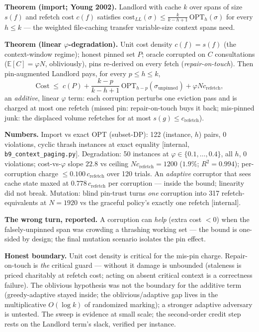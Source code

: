\documentclass[11pt,a4paper]{article}
\begin{document}
\begin{thebox}
\textbf{Theorem (import; Young 2002).} Landlord with cache $k$ over spans of size $s(f)$ and refetch cost $c(f)$ satisfies $\mathrm{cost}_{LL}(\sigma) \le \tfrac{k}{k-h+1}\,\mathrm{OPT}_h(\sigma)$ for every $h \le k$ --- the weighted file-caching transfer variable-size context spans need.

\textbf{Theorem (linear $\varphi$-degradation).} Unit cost density $c(f)=s(f)$ (the context-window regime); honest pinned set $P$; oracle corrupted on $C$ consultations ($\mathbb{E}[C]=\varphi N$, obliviously), pins re-derived on every fetch (\emph{repair-on-touch}). Then pin-augmented Landlord pays, for every $p \le h \le k$,
\[\mathrm{Cost} \;\le\; c(P) + \frac{k-p}{k-h+1}\,\mathrm{OPT}_{h-p}(\sigma_{\mathrm{unpinned}}) + \varphi N c_{\mathrm{refetch}},\]
an \emph{additive}, linear $\varphi$ term: each corruption perturbs one eviction pass and is charged at most one refetch (missed pin: repair-on-touch buys it back; mis-pinned junk: the displaced volume refetches for at most $s(g) \le c_{\mathrm{refetch}}$).
\end{thebox}

\textbf{Numbers.} Import vs exact OPT (subset-DP): 122 (instance, $h$) pairs, 0 violations, cyclic thrash instances at exact equality [internal, \texttt{b9\_context\_paging.py}]. Degradation: 50 instances at $\varphi\in\{0.1,\dots,0.4\}$, all $h$, 0 violations; cost-vs-$\varphi$ slope $22.8$ vs ceiling $N c_{\mathrm{refetch}}=1200$ ($1.9\%$; $R^2=0.994$); per-corruption charge $\le 0.100\,c_{\mathrm{refetch}}$ over 120 trials. An \emph{adaptive} corruptor that sees cache state maxed at $0.778\,c_{\mathrm{refetch}}$ per corruption --- inside the bound; linearity did not break. Mutation: blind pin-trust turns \emph{one} corruption into 317 refetch-equivalents at $N{=}1920$ vs the graceful policy's exactly one refetch [internal].

\textbf{The wrong turn, reported.} A corruption can \emph{help} (extra cost $<0$) when the falsely-unpinned span was crowding a thrashing working set --- the bound is one-sided by design; the final mutation scenario isolates the pin effect.

\begin{boundary}
\textbf{Honest boundary.} Unit cost density is critical for the mis-pin charge. Repair-on-touch is \emph{the} critical guard --- without it damage is unbounded (staleness is priced charitably at refetch cost; acting on absent critical context is a correctness failure). The oblivious hypothesis was not the boundary for the additive term (greedy-adaptive stayed inside; the oblivious/adaptive gap lives in the multiplicative $O(\log k)$ of randomized marking); a stronger adaptive adversary is untested. The sweep is evidence at small scale; the second-order credit step rests on the Landlord term's slack, verified per instance.
\end{boundary}
\end{document}

